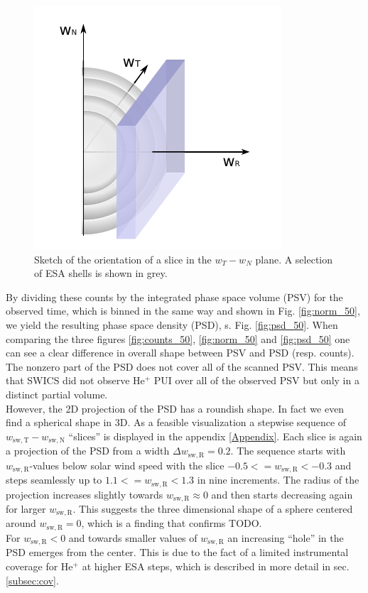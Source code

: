 \begin{figure}[h]
	\includegraphics[width=.5\textwidth]{Figures/sketch_slice_R2.pdf}
	\centering
	\caption{Sketch of the orientation of a slice in the $w_T - w_N$ plane. A selection of ESA shells is shown in grey.}
	\label{fig:sketch_slice_R}
\end{figure}
By dividing these counts by the integrated phase space volume (PSV) for the observed time, which is binned in the same way and shown in Fig. \ref{fig:norm_50}, we yield the resulting phase space density (PSD), s. Fig. \ref{fig:psd_50}. When comparing the three figures \ref{fig:counts_50}, \ref{fig:norm_50} and \ref{fig:psd_50} one can see a clear difference in overall shape between PSV and PSD (resp. counts). The nonzero part of the PSD does not cover all of the scanned PSV. This means that SWICS did not observe $\mathrm{He^{+}}$ PUI over all of the observed PSV but only in a distinct partial volume.\\ 
However, the 2D projection of the PSD has a roundish shape. In fact we even find a spherical shape in 3D. As a feasible visualization a stepwise sequence of $w_\mathrm{sw,T} - w_\mathrm{sw,N}$ ``slices'' is displayed in the appendix \ref{Appendix}. Each slice is again a projection of the PSD from a width $\Delta w_\mathrm{sw,R} = 0.2$. The sequence starts with $w_\mathrm{sw,R}$-values below solar wind speed with the slice $-0.5 <= w_\mathrm{sw,R} < -0.3$ and steps seamlessly up to $1.1 <= w_\mathrm{sw,R} < 1.3$ in nine increments. The radius of the projection increases slightly towards $ w_\mathrm{sw,R} \approx 0$ and then starts decreasing again for larger $w_\mathrm{sw,R}$. This suggests the three dimensional shape of a sphere centered around $w_\mathrm{sw,R} = 0$, which is a finding that confirms TODO. \\
For $w_\mathrm{sw,R} < 0$ and towards smaller values of $w_\mathrm{sw,R}$ an increasing ``hole'' in the PSD emerges from the center. This is due to the fact of a limited instrumental coverage for $\mathrm{He^{+}}$ at higher ESA steps, which is described in more detail in sec. \ref{subsec:cov}. \\
